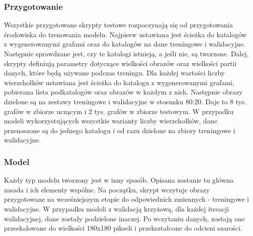 \subsubsection{Przygotowanie}
Wszystkie przygotowane skrypty testowe rozpoczynają się od przygotowania środowiska do trenowania modelu.
Najpierw ustawiana jest ścieżka do katalogów z wygenerowanymi grafami oraz do katalogów na dane treningowe i walidacyjne.
Następnie sprawdzane jest, czy te katalogi istnieją, a jeśli nie, są tworzone.
Dalej, skrypty definiują parametry dotyczące wielkości obrazów oraz wielkości partii danych, które będą używane podczas treningu.
Dla każdej wartości liczby wierzchołków ustawiana jest ścieżka do katalogu z wygenerowanymi grafami,
pobierana lista podkatalogów oraz obrazów w każdym z nich.
Następnie obrazy dzielone są na zestawy treningowe i walidacyjne w stosunku 80:20.
Daje to 8 tys. grafów w zbiorze uczącym i 2 tys. grafów w zbiorze testowym.
W przypadku modeli wykorzystujących wszystkie warianty liczby wierzchołków, dane przenoszone są do jednego katalogu
i od razu dzielone na zbiory treningowe i walidacyjne.

\subsubsection{Model}
Każdy typ modelu tworzony jest w inny sposób. Opisana zostanie tu główna zasada i ich elementy wspólne.
Na początku, skrypt wczytuje obrazy przygotowane na wcześniejszym etapie do odpowiednich zmiennych - treningowe i walidacyjne.
W przypadku modeli z walidacją krzyżową, dla każdej itreacji walidacyjnej, dane zostały podzielone inaczej.
Po wczytaniu danych, zostają one przeskalowane do wielkości 180x180 pikseli i przekształcone do odcieni szarości.

